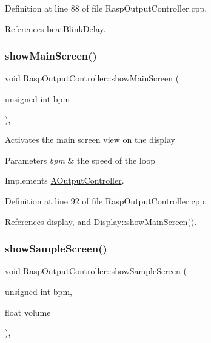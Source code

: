 Definition at line 88 of file Rasp\+Output\+Controller.\+cpp.



References beat\+Blink\+Delay.

\mbox{\label{class_rasp_output_controller_ad195a3d664b7c7e5680cd8949203c1fc}} 
\subsubsection{\texorpdfstring{show\+Main\+Screen()}{showMainScreen()}}
{\footnotesize\ttfamily void Rasp\+Output\+Controller\+::show\+Main\+Screen (\begin{DoxyParamCaption}\item[{unsigned int}]{bpm }\end{DoxyParamCaption})\hspace{0.3cm}{\ttfamily [override]}, {\ttfamily [virtual]}}

Activates the main screen view on the display 
\begin{DoxyParams}{Parameters}
{\em bpm} & the speed of the loop \\
\hline
\end{DoxyParams}


Implements \hyperlink{class_a_output_controller_ace7df9de71110b3615156b9bd06a9349}{A\+Output\+Controller}.



Definition at line 92 of file Rasp\+Output\+Controller.\+cpp.



References display, and Display\+::show\+Main\+Screen().

\mbox{\label{class_rasp_output_controller_a613d3a1d1ceb31875be95e4a4b733fba}} 
\subsubsection{\texorpdfstring{show\+Sample\+Screen()}{showSampleScreen()}}
{\footnotesize\ttfamily void Rasp\+Output\+Controller\+::show\+Sample\+Screen (\begin{DoxyParamCaption}\item[{unsigned int}]{bpm,  }\item[{float}]{volume }\end{DoxyParamCaption})\hspace{0.3cm}{\ttfamily [override]}, {\ttfamily [virtual]}}


